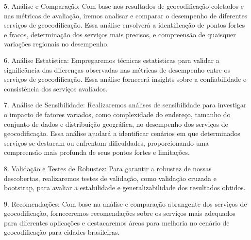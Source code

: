 \documentclass{article}
\begin{document}
5. Análise e Comparação: Com base nos resultados de geocodificação coletados e nas métricas de avaliação, iremos analisar e comparar o desempenho de diferentes serviços de geocodificação. Essa análise envolverá a identificação de pontos fortes e fracos, determinação dos serviços mais precisos, e compreensão de quaisquer variações regionais no desempenho.

6. Análise Estatística: Empregaremos técnicas estatísticas para validar a significância das diferenças observadas nas métricas de desempenho entre os serviços de geocodificação. Essa análise fornecerá insights sobre a confiabilidade e consistência dos serviços avaliados.

7. Análise de Sensibilidade: Realizaremos análises de sensibilidade para investigar o impacto de fatores variados, como complexidade do endereço, tamanho do conjunto de dados e distribuição geográfica, no desempenho dos serviços de geocodificação. Essa análise ajudará a identificar cenários em que determinados serviços se destacam ou enfrentam dificuldades, proporcionando uma compreensão mais profunda de seus pontos fortes e limitações.

8. Validação e Testes de Robustez: Para garantir a robustez de nossas descobertas, realizaremos testes de validação, como validação cruzada e bootstrap, para avaliar a estabilidade e generalizabilidade dos resultados obtidos.

9. Recomendações: Com base na análise e comparação abrangente dos serviços de geocodificação, forneceremos recomendações sobre os serviços mais adequados para diferentes aplicações e destacaremos áreas para melhoria no cenário de geocodificação para cidades brasileiras.

   
 



\end{document}
